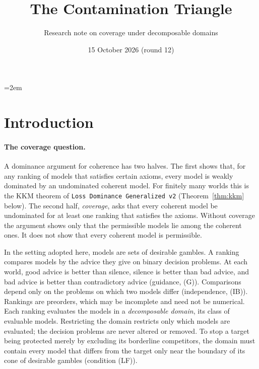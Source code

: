 \documentclass[11pt]{article}
\title{The Contamination Triangle}
\author{Research note on coverage under decomposable domains}
\date{15 October 2026 (round 12)}
\theoremstyle{definition}
\theoremstyle{remark}
\newcommand{\src}[1]{\texttt{#1}}
\begin{document}
\emergencystretch=2em
\maketitle

\section{Introduction}\label{sec:intro}

\paragraph{The coverage question.}
A dominance argument for coherence has two halves. The first shows that, for any ranking of models that satisfies certain axioms, every model is weakly dominated by an undominated coherent model. For finitely many worlds this is the KKM theorem of \src{Loss Dominance Generalized v2} (Theorem~\ref{thm:kkm} below). The second half, \emph{coverage}, asks that every coherent model be undominated for at least one ranking that satisfies the axioms. Without coverage the argument shows only that the permissible models lie among the coherent ones. It does not show that every coherent model is permissible.

In the setting adopted here, models are sets of desirable gambles. A ranking compares models by the advice they give on binary decision problems. At each world, good advice is better than silence, silence is better than bad advice, and bad advice is better than contradictory advice (guidance, (G)). Comparisons depend only on the problems on which two models differ (independence, (IB)). Rankings are preorders, which may be incomplete and need not be numerical. Each ranking evaluates the models in a \emph{decomposable domain}, its class of evaluable models. Restricting the domain restricts only which models are evaluated; the decision problems are never altered or removed. To stop a target being protected merely by excluding its borderline competitors, the domain must contain every model that differs from the target only near the boundary of its cone of desirable gambles (condition (LF)).
\end{document}
